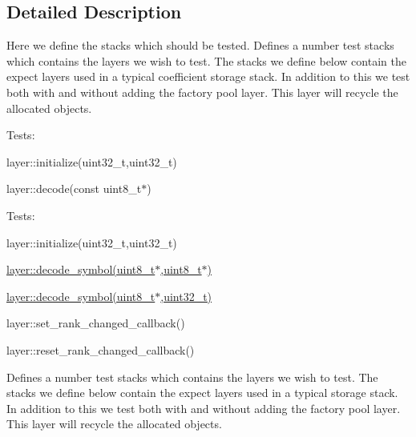 \subsection{Detailed Description}
Here we define the stacks which should be tested. Defines a number test stacks which contains the layers we wish to test. The stacks we define below contain the expect layers used in a typical coefficient storage stack. In addition to this we test both with and without adding the factory pool layer. This layer will recycle the allocated objects.

Tests\-:
\begin{DoxyItemize}
\item layer\-::initialize(uint32\-\_\-t,uint32\-\_\-t)
\item layer\-::decode(const uint8\-\_\-t$\ast$)
\end{DoxyItemize}

Tests\-:
\begin{DoxyItemize}
\item layer\-::initialize(uint32\-\_\-t,uint32\-\_\-t)
\item \hyperlink{group__decoder__api_gae28d93bf78534b4f4f4052ad6b1f7a4d}{layer\-::decode\-\_\-symbol(uint8\-\_\-t$\ast$,uint8\-\_\-t$\ast$)}
\item \hyperlink{group__decoder__api_ga14ba28f27d03e2eee864bc7eed6cb188}{layer\-::decode\-\_\-symbol(uint8\-\_\-t$\ast$,uint32\-\_\-t)}
\item layer\-::set\-\_\-rank\-\_\-changed\-\_\-callback()
\item layer\-::reset\-\_\-rank\-\_\-changed\-\_\-callback()
\end{DoxyItemize}

Defines a number test stacks which contains the layers we wish to test. The stacks we define below contain the expect layers used in a typical storage stack. In addition to this we test both with and without adding the factory pool layer. This layer will recycle the allocated objects. 

